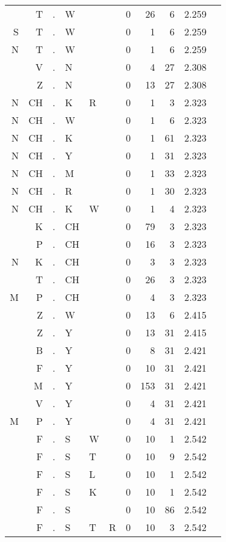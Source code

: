\begin{longtable}{r@{ } r@{ } c@{ } l@{ } l@{ } l@{ } r r r r l }
  & T & . & W &   &   & 0 & 26 & 6 & 2.259 &  \\
S & T & . & W &   &   & 0 & 1 & 6 & 2.259 &  \\
N & T & . & W &   &   & 0 & 1 & 6 & 2.259 &  \\
  & V & . & N &   &   & 0 & 4 & 27 & 2.308 &  \\
  & Z & . & N &   &   & 0 & 13 & 27 & 2.308 &  \\
N & CH & . & K & R &   & 0 & 1 & 3 & 2.323 &  \\
N & CH & . & W &   &   & 0 & 1 & 6 & 2.323 &  \\
N & CH & . & K &   &   & 0 & 1 & 61 & 2.323 &  \\
N & CH & . & Y &   &   & 0 & 1 & 31 & 2.323 &  \\
N & CH & . & M &   &   & 0 & 1 & 33 & 2.323 &  \\
N & CH & . & R &   &   & 0 & 1 & 30 & 2.323 &  \\
N & CH & . & K & W &   & 0 & 1 & 4 & 2.323 &  \\
  & K & . & CH &   &   & 0 & 79 & 3 & 2.323 &  \\
  & P & . & CH &   &   & 0 & 16 & 3 & 2.323 &  \\
N & K & . & CH &   &   & 0 & 3 & 3 & 2.323 &  \\
  & T & . & CH &   &   & 0 & 26 & 3 & 2.323 &  \\
M & P & . & CH &   &   & 0 & 4 & 3 & 2.323 &  \\
  & Z & . & W &   &   & 0 & 13 & 6 & 2.415 &  \\
  & Z & . & Y &   &   & 0 & 13 & 31 & 2.415 &  \\
  & B & . & Y &   &   & 0 & 8 & 31 & 2.421 &  \\
  & F & . & Y &   &   & 0 & 10 & 31 & 2.421 &  \\
  & M & . & Y &   &   & 0 & 153 & 31 & 2.421 &  \\
  & V & . & Y &   &   & 0 & 4 & 31 & 2.421 &  \\
M & P & . & Y &   &   & 0 & 4 & 31 & 2.421 &  \\
  & F & . & S & W &   & 0 & 10 & 1 & 2.542 &  \\
  & F & . & S & T &   & 0 & 10 & 9 & 2.542 &  \\
  & F & . & S & L &   & 0 & 10 & 1 & 2.542 &  \\
  & F & . & S & K &   & 0 & 10 & 1 & 2.542 &  \\
  & F & . & S &   &   & 0 & 10 & 86 & 2.542 &  \\
  & F & . & S & T & R & 0 & 10 & 3 & 2.542 &  \\

\end{longtable}
